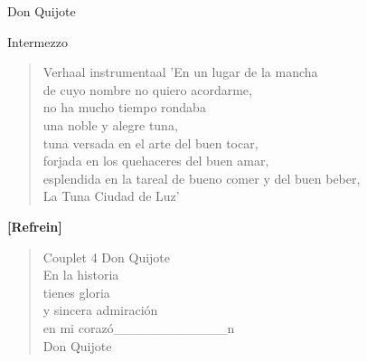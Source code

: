 \begin{song}{Don Quijote}
\begin{instrumental}{Intermezzo}
\measure{}\measure{}\measure{}\measure{}\measure{}\measure{}\measure{}\measure{}\measure{}\measure{}\measure{}\measure{}\measure{}\measure{}\measure{}\measure*{}
\end{instrumental}

\begin{verse}{Verhaal instrumentaal}
'En un lugar de la mancha\\
de cuyo nombre no quiero acordarme,\\
no ha mucho tiempo rondaba\\
una noble y alegre tuna,\\
tuna versada en el arte del buen tocar,\\
forjada en los quehaceres del buen amar,\\
esplendida en la tareal de bueno comer y del buen beber,\\
La Tuna Ciudad de Luz'
\end{verse}

\textbf{[Refrein]}

\begin{verse}{Couplet 4}
Don Quijote \\
En la historia\\
tienes gloria\\
y sincera admiración\hspace{1em}\\
en mi corazó\_\_\_\_\_\_\_\_\_\_\_\_n\\
Don Quijote  
\end{verse}
\end{song}
